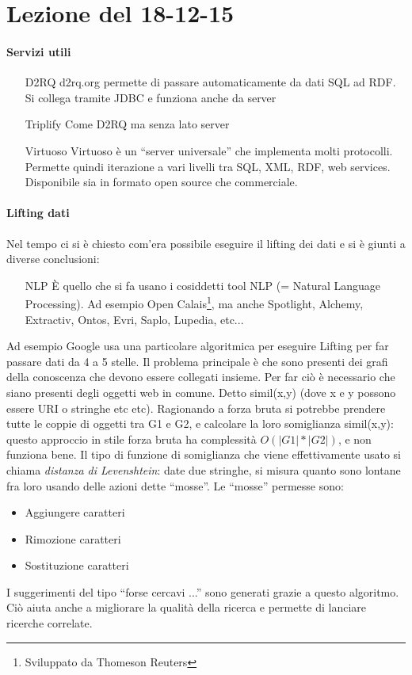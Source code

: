 \section{Lezione del 18-12-15}

\paragraph*{Servizi utili}
\begin{itemize}
\item[D2RQ] d2rq.org permette di passare automaticamente da dati SQL ad RDF. Si collega tramite JDBC e funziona anche da server
\item[Triplify] Come D2RQ ma senza lato server
  \item[Virtuoso] Virtuoso \`e un ``server universale'' che implementa molti protocolli. Permette quindi iterazione a vari livelli tra SQL, XML, RDF, web services. Disponibile sia in formato open source che commerciale.
\end{itemize}

\paragraph*{Lifting dati} Nel tempo ci si \`e chiesto com'era possibile eseguire il lifting dei dati e si \`e giunti a diverse conclusioni:
\begin{itemize}
\item[NLP] \`E quello che si fa usano i cosiddetti tool NLP (= Natural Language Processing). Ad esempio Open Calais\footnote{Sviluppato da Thomeson Reuters}, ma anche Spotlight, Alchemy, Extractiv, Ontos, Evri, Saplo, Lupedia, etc...
\end{itemize}

Ad esempio Google usa una particolare algoritmica per eseguire Lifting per far passare dati da 4 a 5 stelle. Il problema principale \`e che sono presenti dei grafi della conoscenza che devono essere collegati insieme. Per far ci\`o \`e necessario che siano presenti degli oggetti web in comune. Detto simil(x,y) (dove x e y possono essere URI o stringhe etc etc). Ragionando a forza bruta si potrebbe prendere tutte le coppie di oggetti tra G1 e G2, e calcolare la loro somiglianza simil(x,y): questo approccio in stile forza bruta ha complessit\`a $O(|G1|*|G2|)$, e non funziona bene. Il tipo di funzione di somiglianza che viene effettivamente usato si chiama \textit{distanza di Levenshtein}: date due stringhe, si misura quanto sono lontane fra loro usando delle azioni dette ``mosse''. Le ``mosse'' permesse sono:
\begin{itemize}
\item Aggiungere caratteri
\item Rimozione caratteri
\item Sostituzione caratteri
\end{itemize}
I suggerimenti del tipo ``forse cercavi ...'' sono generati grazie a questo algoritmo. Ci\`o aiuta anche a migliorare la qualit\`a della ricerca e permette di lanciare ricerche correlate.


